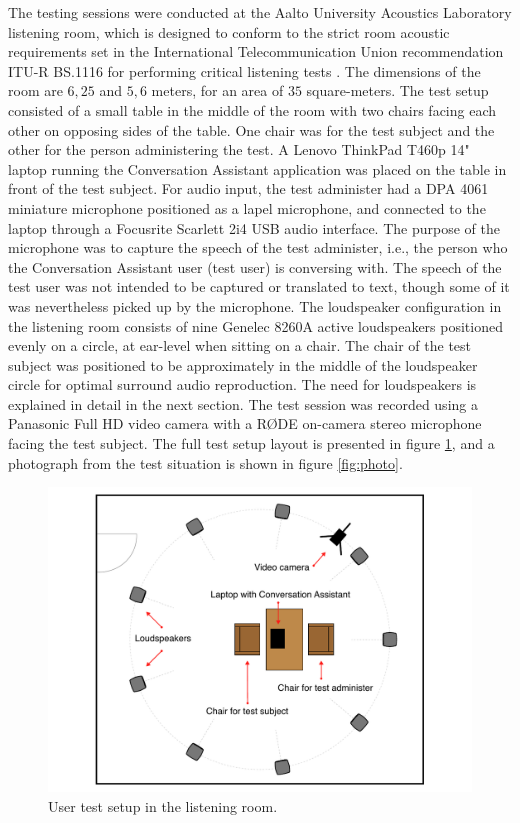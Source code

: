 \documentclass[english, 12pt, a4paper, pdftex, elec, utf8]{aaltothesis}
\begin{document}
The testing sessions were conducted at the Aalto University Acoustics Laboratory listening room, which is designed to conform to the strict room acoustic requirements set in the International Telecommunication Union recommendation ITU-R BS.1116 for performing critical listening tests \cite{ITU1116, jarvinen1999kuunteluhuone}. The dimensions of the room are $6,25$ and $5,6$ meters, for an area of $35$ square-meters. The test setup consisted of a small table in the middle of the room with two chairs facing each other on opposing sides of the table. One chair was for the test subject and the other for the person administering the test. A Lenovo ThinkPad T460p 14" laptop running the Conversation Assistant application was placed on the table in front of the test subject. For audio input, the test administer had a DPA 4061 miniature microphone positioned as a lapel microphone, and connected to the laptop through a Focusrite Scarlett 2i4 USB audio interface. The purpose of the microphone was to capture the speech of the test administer, i.e., the person who the Conversation Assistant user (test user) is conversing with. The speech of the test user was not intended to be captured or translated to text, though some of it was nevertheless picked up by the microphone. The loudspeaker configuration in the listening room consists of nine Genelec 8260A active loudspeakers positioned evenly on a circle, at ear-level when sitting on a chair. The chair of the test subject was positioned to be approximately in the middle of the loudspeaker circle for optimal surround audio reproduction. The need for loudspeakers is explained in detail in the next section. The test session was recorded using a Panasonic Full HD video camera with a RØDE on-camera stereo microphone facing the test subject. The full test setup layout is presented in figure \ref{fig:setup}, and a photograph from the test situation is shown in figure \ref{fig:photo}. \\
\begin{figure}[h]
	\centering
	\includegraphics[trim={1.5cm 0cm 1.5cm 0cm}, clip, width=\textwidth]{setup2.pdf}
	\caption{User test setup in the listening room.}
	\label{fig:setup} 
\end{figure}
\end{document}
